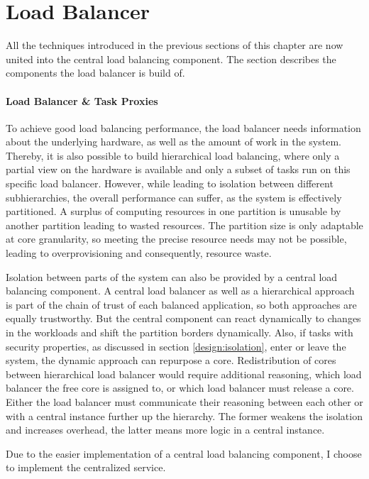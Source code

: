 \section{Load Balancer}
\label{design:balancer}

All the techniques introduced in the previous sections of this chapter
are now united into the central load balancing component.
The section describes the components the load balancer is build of.


\paragraph{Load Balancer \& Task Proxies}
To achieve good load balancing performance, the load balancer needs information
about the underlying hardware, as well as the amount of work in the system.
Thereby, it is also possible to build hierarchical load balancing, where
only a partial view on the hardware is available and only a subset of tasks run
on this specific load balancer.
However, while leading to isolation between different subhierarchies,
the overall performance can suffer, as the system is effectively partitioned.
A surplus of computing resources in one partition is unusable by another
partition leading to wasted resources.
The partition size is only adaptable at core granularity, so meeting the
precise resource needs may not be possible, leading to overprovisioning and
consequently, resource waste.

Isolation between parts of the system can also be provided by a central load
balancing component.
A central load balancer as well as a hierarchical approach is part of the chain
of trust of each balanced application, so both approaches are equally
trustworthy.
But the central component can react dynamically to changes in the workloads and
shift the partition borders dynamically.
Also, if tasks with security properties, as discussed in section
\ref{design:isolation}, enter or leave the system, the dynamic approach can
repurpose a core.
Redistribution of cores between hierarchical load balancer would require
additional reasoning, which load balancer the free core is assigned to, or which
load balancer must release a core.
Either the load balancer must communicate their reasoning between each other or
with a central instance further up the hierarchy.
The former weakens the isolation and increases overhead, the latter means more
logic in a central instance.

Due to the easier implementation of a central load balancing component,
I choose to implement the centralized service.
\\

